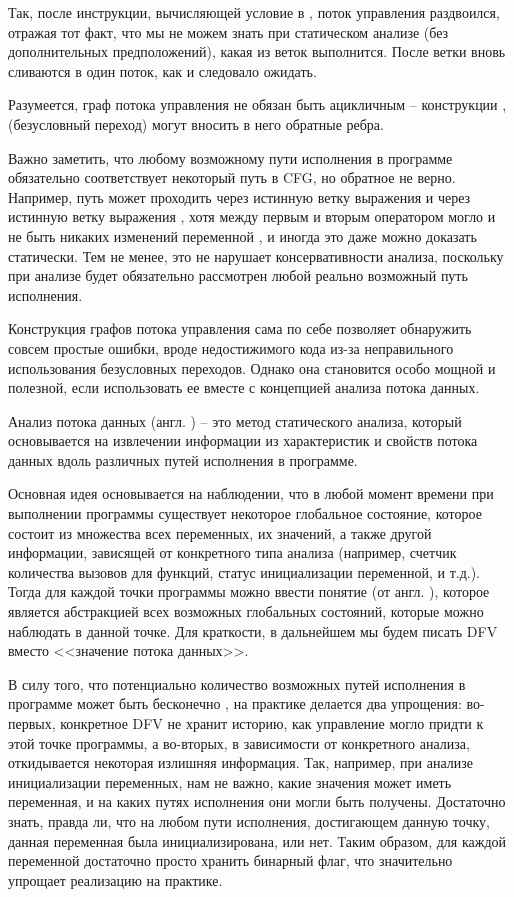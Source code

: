Так, после инструкции, вычисляющей условие в , поток управления раздвоился, отражая тот факт, что мы не можем знать при статическом анализе (без дополнительных предположений), какая из веток выполнится. После ветки вновь сливаются в один поток, как и следовало ожидать.

Разумеется, граф потока управления не обязан быть ацикличным -- конструкции ,  (безусловный переход) могут вносить в него обратные ребра.

Важно заметить, что любому возможному пути исполнения в программе обязательно соответствует некоторый путь в CFG, но обратное не верно. Например, путь может проходить через истинную ветку выражения \linebreak {} и через истинную ветку выражения , хотя между первым и вторым оператором могло и не быть никаких изменений переменной , и иногда это даже можно доказать статически.
Тем не менее, это не нарушает консервативности анализа, поскольку при анализе будет обязательно рассмотрен любой реально возможный путь исполнения.

Конструкция графов потока управления сама по себе позволяет обнаружить совсем простые ошибки, вроде недостижимого кода из-за неправильного использования безусловных переходов. Однако она становится особо мощной и полезной, если использовать ее вместе с концепцией анализа потока данных.

\begin{definition}
  Анализ потока данных (англ. )  -- это метод статического анализа, который основывается на извлечении информации из характеристик и свойств потока данных вдоль различных путей исполнения в программе.
\end{definition}

Основная идея основывается на наблюдении, что в любой момент времени при выполнении программы существует некоторое глобальное состояние, которое состоит из множества всех переменных, их значений, а также другой информации, зависящей от конкретного типа анализа (например, счетчик количества вызовов для функций, статус инициализации переменной, и т.д.). Тогда для каждой точки программы можно ввести понятие  (от англ. ), которое является абстракцией всех возможных глобальных состояний, которые можно наблюдать в данной точке. Для краткости, в дальнейшем мы будем писать DFV вместо <<значение потока данных>>.

В силу того, что потенциально количество возможных путей исполнения в программе может быть бесконечно \cite{dragon-book}, на практике делается два упрощения: во-первых, конкретное DFV не хранит историю, как управление могло придти к этой точке программы, а во-вторых, в зависимости от конкретного анализа, откидывается некоторая излишняя информация. Так, например, при анализе инициализации переменных, нам не важно, какие значения может иметь переменная, и на каких путях исполнения они могли быть получены. Достаточно знать, правда ли, что на любом пути исполнения, достигающем данную точку, данная переменная была инициализирована, или нет. Таким образом, для каждой переменной достаточно просто хранить бинарный флаг, что значительно упрощает реализацию на практике.

